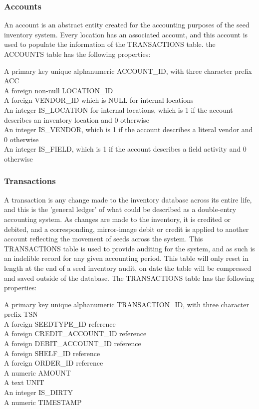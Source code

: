 \documentclass[12pt, letterpaper,oneocolumn]{article}
\begin{document}
	\subsubsection{Accounts}
An account is an abstract entity created for the accounting purposes of the seed inventory system. Every location has an associated account, and this account is used to populate the information of the TRANSACTIONS table. the ACCOUNTS table has the following properties:\\
\begin{outline}
	\1 A primary key unique alphanumeric ACCOUNT\_ID, with three character prefix ACC\\
	\1 A foreign non-null LOCATION\_ID\\
	\1 A foreign VENDOR\_ID which is NULL for internal locations\\
	\1 An integer IS\_LOCATION for internal locations, which is 1 if the account describes an inventory location and 0 otherwise\\
	\1 An integer IS\_VENDOR, which is 1 if the account describes a literal vendor and 0 otherwise\\
	\1 An integer IS\_FIELD, which is 1 if the account describes a field activity and 0 otherwise\\
\end{outline}

	\subsubsection{Transactions}
A transaction is any change made to the inventory database across its entire life, and this is the 'general ledger' of what could be described as a double-entry accounting system. As changes are made to the inventory, it is credited or debited, and a corresponding, mirror-image debit or credit is applied to another account reflecting the movement of seeds across the system. This TRANSACTIONS table is used to provide auditing for the system, and as such is an indelible record for any given accounting period. This table will only reset in length at the end of a seed inventory audit, on date the table will be compressed and saved outside of the database. The TRANSACTIONS table has the following properties:\\
\begin{outline}
\1 A primary key unique alphanumeric TRANSACTION\_ID, with three character prefix TSN\\
\1 A foreign SEEDTYPE\_ID reference\\
\1 A foreign CREDIT\_ACCOUNT\_ID reference\\
\1 A foreign DEBIT\_ACCOUNT\_ID reference\\
\1 A foreign SHELF\_ID reference\\
\1 A foreign ORDER\_ID reference\\
\1 A numeric AMOUNT\\
\1 A text UNIT\\
\1 An integer IS\_DIRTY\\
\1 A numeric TIMESTAMP
\end{outline}
\end{document}
